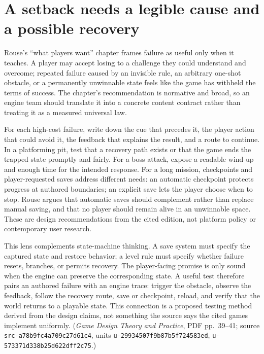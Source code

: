 \section{A setback needs a legible cause and a possible recovery}\label{06-engine-ii-ch047-a-setback-needs-a-legible-cause-and-a-possible-recovery}

Rouse's ``what players want'' chapter frames failure as useful only when it teaches. A player may accept losing to a challenge they could understand and overcome; repeated failure caused by an invisible rule, an arbitrary one-shot obstacle, or a permanently unwinnable state feels like the game has withheld the terms of success. The chapter's recommendation is normative and broad, so an engine team should translate it into a concrete content contract rather than treating it as a measured universal law.

For each high-cost failure, write down the cue that precedes it, the player action that could avoid it, the feedback that explains the result, and a route to continue. In a platforming pit, test that a recovery path exists or that the game ends the trapped state promptly and fairly. For a boss attack, expose a readable wind-up and enough time for the intended response. For a long mission, checkpoints and player-requested saves address different needs: an automatic checkpoint protects progress at authored boundaries; an explicit save lets the player choose when to stop. Rouse argues that automatic saves should complement rather than replace manual saving, and that no player should remain alive in an unwinnable space. These are design recommendations from the cited edition, not platform policy or contemporary user research.

This lens complements state-machine thinking. A save system must specify the captured state and restore behavior; a level rule must specify whether failure resets, branches, or permits recovery. The player-facing promise is only sound when the engine can preserve the corresponding state. A useful test therefore pairs an authored failure with an engine trace: trigger the obstacle, observe the feedback, follow the recovery route, save or checkpoint, reload, and verify that the world returns to a playable state. This connection is a proposed testing method derived from the design claims, not something the source says the cited games implement uniformly. (\emph{Game Design Theory and Practice}, PDF pp.~39--41; source \texttt{src-a78b9fc4a709c27d61c4}, units \texttt{u-29934507f9b87b5f724583ed}, \texttt{u-573371d338b25d622dff2c75}.)

